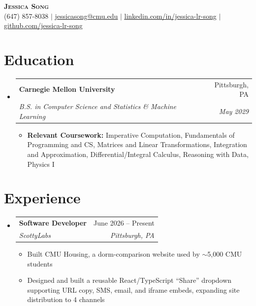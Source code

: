 \documentclass[letterpaper,11pt]{article}
\makeatletter
\newcommand{\resumeItem}[1]{
  \item\small{
    {#1 \vspace{-2pt}}
  }
}
\newcommand{\resumeSubheading}[4]{
  \vspace{-2pt}\item
    \begin{tabular*}{0.97\textwidth}[t]{l@{\extracolsep{\fill}}r}
      \textbf{#1} & #2 \\
      \textit{\small#3} & \textit{\small #4} \\
    \end{tabular*}\vspace{-7pt}
}
\newcommand{\resumeSubHeadingListStart}{\begin{itemize}[leftmargin=0.15in, label={}]}
\newcommand{\resumeSubHeadingListEnd}{\end{itemize}}
\newcommand{\resumeItemListStart}{\begin{itemize}}
\newcommand{\resumeItemListEnd}{\end{itemize}\vspace{-5pt}}
\makeatother
\begin{document}
\begin{center}
    \textbf{\Huge \scshape Jessica Song} \\ \vspace{1pt}
    \small (647) 857-8038 $|$ \href{mailto:jessicasong@cmu.edu}{\underline{jessicasong@cmu.edu}} $|$
    \href{https://www.linkedin.com/in/jessica-lr-song}{\underline{linkedin.com/in/jessica-lr-song}} $|$
    \href{https://github.com/jessica-lr-song}{\underline{github.com/jessica-lr-song}}
\end{center}


\section{Education}
  \resumeSubHeadingListStart
    \resumeSubheading
      {Carnegie Mellon University}{Pittsburgh, PA}
      {B.S. in Computer Science and Statistics \& Machine Learning}{May 2029}
      \resumeItemListStart
        \resumeItem{\textbf{Relevant Coursework:} Imperative Computation, Fundamentals of Programming and CS, Matrices and Linear Transformations, Integration and Approximation, Differential/Integral Calculus, Reasoning with Data, Physics I}
      \resumeItemListEnd
  \resumeSubHeadingListEnd

\section{Experience}
  \resumeSubHeadingListStart

    \resumeSubheading
      {Software Developer}{June 2026 -- Present}
      {ScottyLabs}{Pittsburgh, PA}
      \resumeItemListStart
        \resumeItem{Built CMU Housing, a dorm-comparison website used by $\sim$5,000 CMU students}
        \resumeItem{Designed and built a reusable React/TypeScript ``Share'' dropdown supporting URL copy, SMS, email, and iframe embeds, expanding site distribution to 4 channels}
      \resumeItemListEnd

  \resumeSubHeadingListEnd

\end{document}
